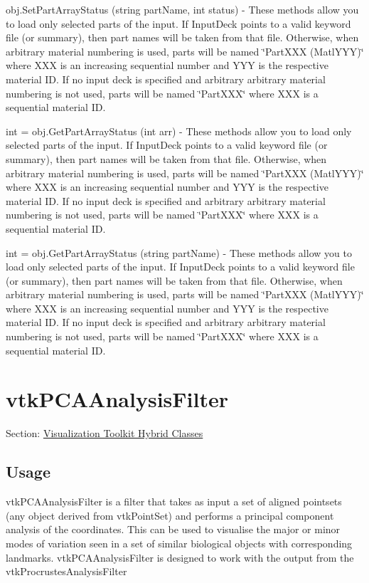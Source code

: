 \begin{DoxyItemize}
\item {\ttfamily obj.\-Set\-Part\-Array\-Status (string part\-Name, int status)} -\/ These methods allow you to load only selected parts of the input. If Input\-Deck points to a valid keyword file (or summary), then part names will be taken from that file. Otherwise, when arbitrary material numbering is used, parts will be named \char`\"{}\-Part\-X\-X\-X (\-Matl\-Y\-Y\-Y)\char`\"{} where X\-X\-X is an increasing sequential number and Y\-Y\-Y is the respective material I\-D. If no input deck is specified and arbitrary arbitrary material numbering is not used, parts will be named \char`\"{}\-Part\-X\-X\-X\char`\"{} where X\-X\-X is a sequential material I\-D.  
\item {\ttfamily int = obj.\-Get\-Part\-Array\-Status (int arr)} -\/ These methods allow you to load only selected parts of the input. If Input\-Deck points to a valid keyword file (or summary), then part names will be taken from that file. Otherwise, when arbitrary material numbering is used, parts will be named \char`\"{}\-Part\-X\-X\-X (\-Matl\-Y\-Y\-Y)\char`\"{} where X\-X\-X is an increasing sequential number and Y\-Y\-Y is the respective material I\-D. If no input deck is specified and arbitrary arbitrary material numbering is not used, parts will be named \char`\"{}\-Part\-X\-X\-X\char`\"{} where X\-X\-X is a sequential material I\-D.  
\item {\ttfamily int = obj.\-Get\-Part\-Array\-Status (string part\-Name)} -\/ These methods allow you to load only selected parts of the input. If Input\-Deck points to a valid keyword file (or summary), then part names will be taken from that file. Otherwise, when arbitrary material numbering is used, parts will be named \char`\"{}\-Part\-X\-X\-X (\-Matl\-Y\-Y\-Y)\char`\"{} where X\-X\-X is an increasing sequential number and Y\-Y\-Y is the respective material I\-D. If no input deck is specified and arbitrary arbitrary material numbering is not used, parts will be named \char`\"{}\-Part\-X\-X\-X\char`\"{} where X\-X\-X is a sequential material I\-D.  
\end{DoxyItemize}\hypertarget{vtkhybrid_vtkpcaanalysisfilter}{}\section{vtk\-P\-C\-A\-Analysis\-Filter}\label{vtkhybrid_vtkpcaanalysisfilter}
Section\-: \hyperlink{sec_vtkhybrid}{Visualization Toolkit Hybrid Classes} \hypertarget{vtkwidgets_vtkxyplotwidget_Usage}{}\subsection{Usage}\label{vtkwidgets_vtkxyplotwidget_Usage}
vtk\-P\-C\-A\-Analysis\-Filter is a filter that takes as input a set of aligned pointsets (any object derived from vtk\-Point\-Set) and performs a principal component analysis of the coordinates. This can be used to visualise the major or minor modes of variation seen in a set of similar biological objects with corresponding landmarks. vtk\-P\-C\-A\-Analysis\-Filter is designed to work with the output from the vtk\-Procrustes\-Analysis\-Filter

